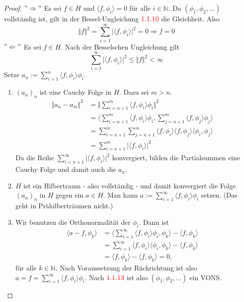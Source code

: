\documentclass[12pt,titlepage]{article}
\numberwithin{equation}{section}
\begin{document}
\begin{proof}
$"\Rightarrow"$ Es sei $f \in H$ und $\langle f, \phi_i \rangle=0$ für alle $i \in \mathbb{N}.$ Da $(\phi_1,\phi_2,\ldots)$ vollständig ist, gilt in der Bessel-Ungleichung $\textcolor{red}{1.1.10}$ die Gleichheit. Also 
\[
\Vert f \Vert^2= \sum_{i=1}^{\infty} \vert \langle f,\phi_i\rangle\vert^2 =0\Rightarrow f=0
\]
$"\Leftarrow"$
Es sei $f\in H$. Nach der Besselschen Ungleichung gilt
\[
\sum_{i=1}^{\infty} \vert \langle f,\phi_i\rangle\vert^2\leq \Vert f\Vert^2< \infty
\]
Setze $a_n:= \sum_{i=1}^n \langle f,\phi_i\rangle \phi_i$.
\begin{enumerate}
\item $(a_n)_n$ ist eine Cauchy Folge in $H$. Dazu sei $m>n$.
\begin{align*}
\Vert a_n -a_m\Vert^2&=\Vert \sum_{i=n+1}^m\langle f,\phi_i \rangle \phi_i\Vert^2\\
&=\langle \sum_{i=n+1}^m\langle f,\phi_i \rangle \phi_i,\sum_{j=n+1}^m\langle f,\phi_j \rangle \phi_j \rangle\\
&=\sum_{i=n+1}^m \sum_{j=n+1}^m \langle f,\phi_i \rangle\langle f,\phi_j \rangle \langle \phi_i,\phi_j \rangle\\
&=\sum_{i=n+1}^m \vert\langle f,\phi_i \rangle \vert^2
\end{align*}
Da die Reihe $\sum_{i=n+1}^{\infty} \vert\langle f,\phi_i \rangle \vert^2$ konvergiert, bilden die Partialsummen eine Cauchy Folge und damit auch die $a_n$.
\item $H$ ist ein Hilbertraum - also vollständig - und damit konvergiert die Folge $(a_n)_n$ in $H$ gegen ein $a\in H.$ Man kann $a:=\sum_{i=1}^{\infty}\langle f,\phi_i\rangle\phi_i$ setzen. (Das geht in Prähilberträumen nicht.)
\item Wir benutzen die Orthonormalität der $\phi_i$. Dann ist
\begin{align*}
\langle a-f, \phi_k \rangle &= \langle \sum_{i=1}^{\infty}\langle f,\phi_i\rangle\phi_i,\phi_k\rangle-\langle f,\phi_k \rangle\\
&=\sum_{i=1}^{\infty}\langle f,\phi_i\rangle\langle \phi_i,\phi_k \rangle -\langle f,\phi_k\rangle\\
&=\langle f,\phi_k\rangle- \langle f,\phi_k \rangle=0,
\end{align*}
für alle $k \in \mathbb{N}.$ Nach Voraussetzung der Rückrichtung ist also $a=f=\sum_{i=1}^{\infty}\langle f,\phi_i\rangle\phi_i$. Nach $\textcolor{red}{1.1.13}$ ist also $(\phi_1,\phi_2,\ldots)$ ein VONS.
\end{enumerate}
\end{proof}
\end{document}
